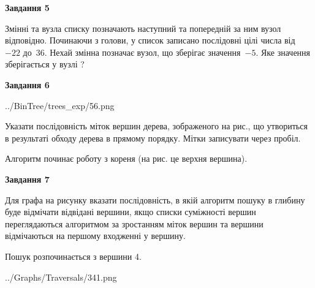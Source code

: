 \documentclass[12pt, ukrainian]{article}
\begin{document}
{\begin {large}
{\begin {center}\textbf{Завдання 5}\end {center}}\par
Змінні  та  вузла списку позначають наступний та попередній за ним вузол відповідно. Починаючи з голови, у список записано послідовні цілі числа від~$-22$ до~$36$. Нехай змінна  позначає вузол, що зберігає значення~$-5$.
Яке значення зберігається у вузлі  ?\par
\newpage

{\begin {center}\textbf{Завдання 6}\end {center}}\par

\begin{center}
	{../BinTree/trees_exp/56.png}
\end{center}
Указати послідовність міток вершин дерева, зображеного на рис., що утвориться в результаті обходу дерева в прямому порядку. Мітки записувати через пробіл.\par Алгоритм починає роботу з кореня (на рис. це верхня вершина).\par
\newpage

{\begin {center}\textbf{Завдання 7}\end {center}}\par
Для графа на рисунку вказати послідовність, в якій алгоритм пошуку в глибину буде відмічати відвідані вершини, якщо списки суміжності вершин переглядаються алгоритмом за зростанням міток вершин та вершини відмічаються на першому вход\-женні у вершину.\par
Пошук розпочинається з вершини 4.\par

\begin{center}
	{../Graphs/Traversals/341.png}
\end{center}\par
\newpage


\end{large}}
\end{document}
